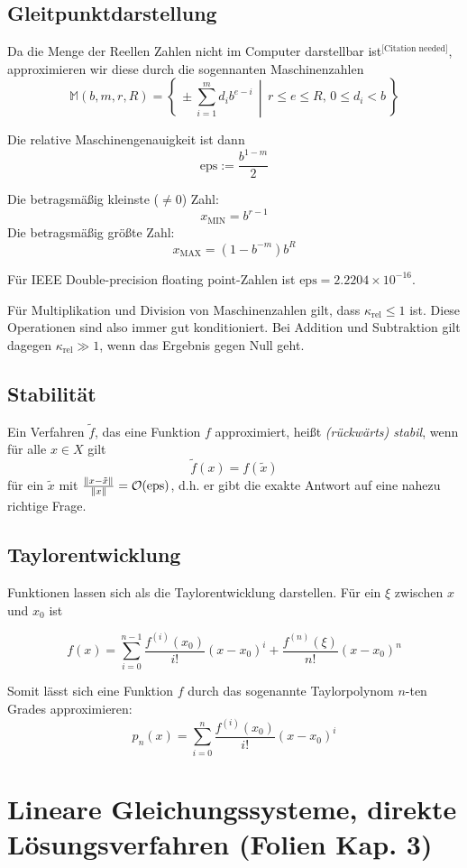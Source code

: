 \documentclass[a4paper,parskip=half*,DIV=7,fontsize=11pt]{scrartcl}
\DeclarePairedDelimiter\norm{\lVert}{\rVert}
\newcommand{\eps}{\mathrm{eps}}
\begin{document}
\subsection{Gleitpunktdarstellung}

Da die Menge der Reellen Zahlen nicht im Computer darstellbar ist${}^{\textrm{[Citation needed]}}$, approximieren wir diese durch die sogennanten Maschinenzahlen
\[\mathbb{M}(b,m,r,R) = \left\{\,\pm\sum_{i=1}^m d_{i}b^{e-i}\,\middle\vert\,r \le e \le R,\,0 \le d_i < b \,\right\}\]

Die relative Maschinengenauigkeit ist dann
\[\eps := \frac{b^{1-m}}{2}\]

Die betragsmäßig kleinste ($\neq 0$) Zahl: 
\[x_\mathrm{MIN} = b^{r-1}\] 
Die betragsmäßig größte Zahl: \[x_\mathrm{MAX} = (1 - b^{-m}) b^R\]

Für IEEE Double-precision floating point-Zahlen ist $\eps = 2.2204 \times 10^{-16}$.

Für Multiplikation und Division von Maschinenzahlen gilt, dass $\kappa_\text{rel} \leq 1$ ist. Diese Operationen sind also immer gut konditioniert. Bei Addition und Subtraktion gilt dagegen $\kappa_\text{rel} \gg 1$, wenn das Ergebnis gegen Null geht.

\subsection{Stabilität}

Ein Verfahren $\tilde{f}$, das eine Funktion $f$ approximiert, heißt \emph{(rückwärts) stabil}, wenn für alle $x \in X$ gilt 
\[\tilde{f}(x) = f(\tilde{x}) \] 
für ein $\tilde{x}$ mit $\frac{\norm{x-\tilde{x}}}{\norm{x}} = \mathcal{O}(\eps)$, d.h. er gibt die exakte Antwort auf eine nahezu richtige Frage.

\subsection{Taylorentwicklung}

Funktionen lassen sich als die Taylorentwicklung darstellen. Für ein $\xi$ zwischen $x$ und $x_0$ ist

\[f(x) = \sum_{i=0}^{n-1} \frac{f^{(i)}(x_0)}{i!}(x-x_0)^i + \frac{f^{(n)}(\xi)}{n!}(x-x_0)^n\]

Somit lässt sich eine Funktion $f$ durch das sogenannte Taylorpolynom $n$-ten Grades approximieren:
\[p_n(x) = \sum_{i=0}^{n} \frac{f^{(i)}(x_0)}{i!}(x-x_0)^i\]

\section{Lineare Gleichungssysteme, direkte Lösungsverfahren (Folien Kap. 3)}
\end{document}

